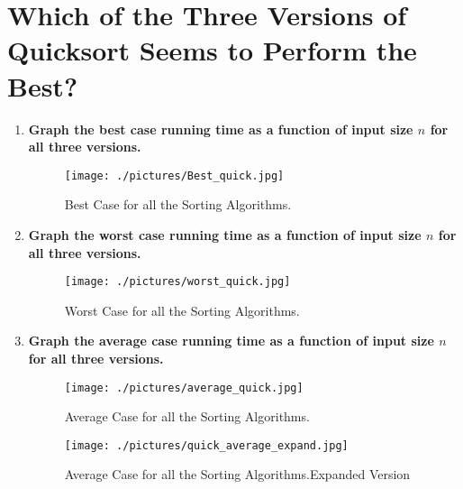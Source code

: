 \documentclass[a4paper,12pt]{article}
\begin{document}
	\section{Which of the Three Versions of Quicksort Seems to Perform the Best?}
	\begin{enumerate}
		\item \textbf{Graph the best case running time as a function of input size $n$ for all three versions.}
		\begin{figure}[h]
			\centering
			\texttt{[image: ./pictures/Best\_quick.jpg]}
			\caption{Best Case for all the Sorting Algorithms.}
		\end{figure}
		\item \textbf{Graph the worst case running time as a function of input size $n$ for all three versions.}
		\begin{figure}[h]
			\centering
			\texttt{[image: ./pictures/worst\_quick.jpg]}
			\caption{Worst Case for all the Sorting Algorithms.}
		\end{figure}
		\item \textbf{Graph the average case running time as a function of input size $n$ for all three versions.}
		\begin{figure}[h]
			\centering
			\texttt{[image: ./pictures/average\_quick.jpg]}
			\caption{Average Case for all the Sorting Algorithms.}
		\end{figure}
		\begin{figure}[h]
			\centering
			\texttt{[image: ./pictures/quick\_average\_expand.jpg]}
			\caption{Average Case for all the Sorting Algorithms.Expanded Version}
		\end{figure}
	\end{enumerate}
	\newpage
\end{document}

